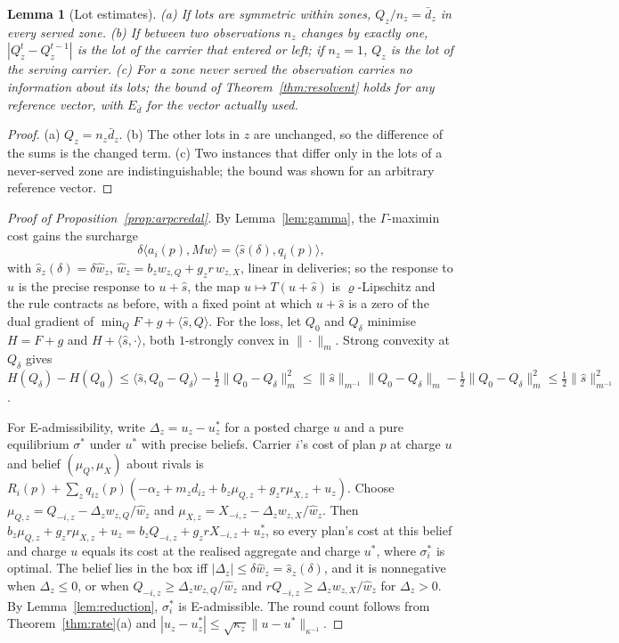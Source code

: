 \documentclass[preprint,12pt]{elsarticle}
\newtheorem{lemma}[theorem]{Lemma}
\theoremstyle{definition}
\theoremstyle{remark}
\newcommand{\ip}[2]{\langle #1,#2\rangle}
\begin{document}
\begin{lemma}[Lot estimates]\label{lem:lots}
(a) If lots are symmetric within zones, $Q_z/n_z=\bar d_z$ in every served zone. (b) If between two observations $n_z$ changes by exactly one, $|Q^t_z-Q^{t-1}_z|$ is the lot of the carrier that entered or left; if $n_z=1$, $Q_z$ is the lot of the serving carrier. (c) For a zone never served the observation carries no information about its lots; the bound of Theorem~\ref{thm:resolvent} holds for any reference vector, with $E_{\bar d}$ for the vector actually used.
\end{lemma}
\begin{proof}
(a) $Q_z=n_z\bar d_z$. (b) The other lots in $z$ are unchanged, so the difference of the sums is the changed term. (c) Two instances that differ only in the lots of a never-served zone are indistinguishable; the bound was shown for an arbitrary reference vector.
\end{proof}

\begin{proof}[Proof of Proposition~\ref{prop:arpcredal}]
By Lemma~\ref{lem:gamma}, the $\Gamma$-maximin cost gains the surcharge
\[\delta\ip{a_i(p)}{Mw}=\ip{\hat s(\delta)}{q_i(p)},\]
with $\hat s_z(\delta)=\delta\hat w_z$, $\hat w_z=b_zw_{z,Q}+g_zr\,w_{z,X}$, linear in deliveries; so the response to $u$ is the precise response to $u+\hat s$, the map $u\mapsto T(u+\hat s)$ is $\varrho$-Lipschitz and the rule contracts as before, with a fixed point at which $u+\hat s$ is a zero of the dual gradient of $\min_QF+g+\ip{\hat s}{Q}$. For the loss, let $Q_0$ and $Q_\delta$ minimise $H=F+g$ and $H+\ip{\hat s}\cdot$, both $1$-strongly convex in $\|\cdot\|_m$. Strong convexity at $Q_\delta$ gives $H(Q_\delta)-H(Q_0)\le\ip{\hat s}{Q_0-Q_\delta}-\tfrac12\|Q_0-Q_\delta\|_m^2\le\|\hat s\|_{m^{-1}}\|Q_0-Q_\delta\|_m-\tfrac12\|Q_0-Q_\delta\|_m^2\le\tfrac12\|\hat s\|_{m^{-1}}^2$.

For E-admissibility, write $\Delta_z=u_z-u^*_z$ for a posted charge $u$ and a pure equilibrium $\sigma^*$ under $u^*$ with precise beliefs. Carrier $i$'s cost of plan $p$ at charge $u$ and belief $(\mu_Q,\mu_X)$ about rivals is $R_i(p)+\sum_zq_{iz}(p)(-\alpha_z+m_zd_{iz}+b_z\mu_{Q,z}+g_zr\mu_{X,z}+u_z)$. Choose $\mu_{Q,z}=Q_{-i,z}-\Delta_zw_{z,Q}/\hat w_z$ and $\mu_{X,z}=X_{-i,z}-\Delta_zw_{z,X}/\hat w_z$. Then $b_z\mu_{Q,z}+g_zr\mu_{X,z}+u_z=b_zQ_{-i,z}+g_zrX_{-i,z}+u^*_z$, so every plan's cost at this belief and charge $u$ equals its cost at the realised aggregate and charge $u^*$, where $\sigma^*_i$ is optimal. The belief lies in the box iff $|\Delta_z|\le\delta\hat w_z=\hat s_z(\delta)$, and it is nonnegative when $\Delta_z\le0$, or when $Q_{-i,z}\ge\Delta_zw_{z,Q}/\hat w_z$ and $rQ_{-i,z}\ge\Delta_zw_{z,X}/\hat w_z$ for $\Delta_z>0$. By Lemma~\ref{lem:reduction}, $\sigma^*_i$ is E-admissible. The round count follows from Theorem~\ref{thm:rate}(a) and $|u_z-u^*_z|\le\sqrt{\kappa_z}\|u-u^*\|_{\kappa^{-1}}$.
\end{proof}
\end{document}
